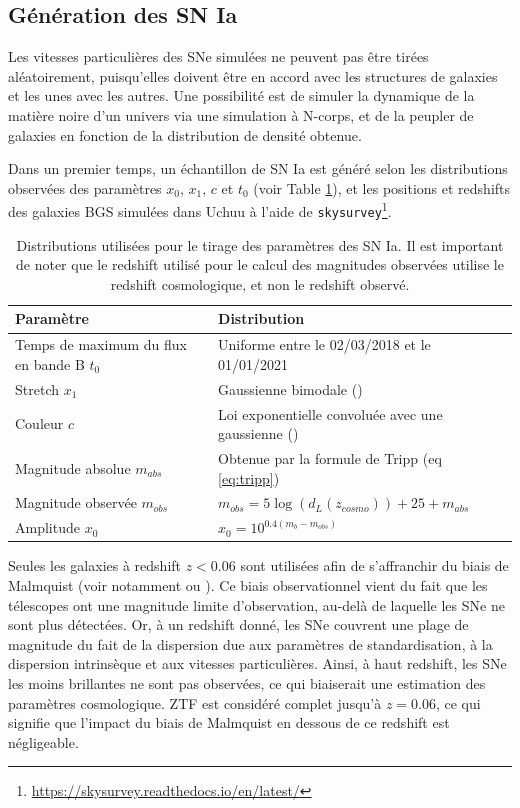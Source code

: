 \documentclass{book}
\def\skysurvey{\texttt{skysurvey}\xspace}
\begin{document}
\subsection{Génération des SN Ia}
\label{sec:gen_SN}

Les vitesses particulières des SNe simulées ne peuvent pas être tirées aléatoirement, puisqu'elles doivent être en accord avec les structures de galaxies et les unes avec les autres. Une possibilité est de simuler la dynamique de la matière noire d'un univers via une simulation à N-corps, et de la peupler de galaxies en fonction de la distribution de densité obtenue. 

Dans un premier temps, un échantillon de SN Ia est généré selon les distributions observées des paramètres $x_0$, $x_1$, $c$ et $t_0$ (voir Table \ref{tab:snia}), et les positions et redshifts des galaxies BGS simulées dans Uchuu à l'aide de \skysurvey\footnote{\href{https://skysurvey.readthedocs.io/en/latest/}{https://skysurvey.readthedocs.io/en/latest/}}.

\begin{table}
    \centering
    \begin{tabular}{p{6.5cm}|p{7cm}}
         Paramètre & Distribution \\
         \hline
         Temps de maximum du flux en bande B $t_0$ & Uniforme entre le 02/03/2018 et le 01/01/2021\\
         Stretch $x_1$ & Gaussienne bimodale (\cite{nicolas_redshift_2021})\\
         Couleur $c$ &  Loi exponentielle convoluée avec une gaussienne (\cite{ginolin_ztf_2024}) \\
         Magnitude absolue $m_{abs}$ & Obtenue par la formule de Tripp (eq \ref{eq:tripp})\\
         Magnitude observée $m_{obs}$ & $m_{obs} = 5 \log(d_L(z_{cosmo})) + 25 + m_{abs}$\\
         Amplitude $x_0$ & $x_0 = 10^{0.4(m_b - m_{obs})}$
    \end{tabular}
    \caption{Distributions utilisées pour le tirage des paramètres des SN Ia. Il est important de noter que le redshift utilisé pour le calcul des magnitudes observées utilise le redshift cosmologique, et non le redshift observé.}
    \label{tab:snia}
\end{table}

Seules les galaxies à redshift $z<0.06$ sont utilisées afin de s'affranchir du biais de Malmquist (voir notamment \cite{carreres_growth-rate_2023} ou \cite{boyd_accounting_2024}). Ce biais observationnel vient du fait que les télescopes ont une magnitude limite d'observation, au-delà de laquelle les SNe ne sont plus détectées. Or, à un redshift donné, les SNe couvrent une plage de magnitude du fait de la dispersion due aux paramètres de standardisation, à la dispersion intrinsèque et aux vitesses particulières. Ainsi, à haut redshift, les SNe les moins brillantes ne sont pas observées, ce qui biaiserait une estimation des paramètres cosmologique. ZTF est considéré complet jusqu'à $z=0.06$, ce qui signifie que l'impact du biais de Malmquist en dessous de ce redshift est négligeable.
\end{document}

